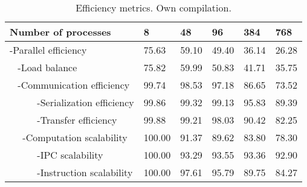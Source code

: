 \begin{table}[htbp]
\centering
\setlength{\extrarowheight}{0pt}
\addtolength{\extrarowheight}{\aboverulesep}
\addtolength{\extrarowheight}{\belowrulesep}
\setlength{\aboverulesep}{0pt}
\setlength{\belowrulesep}{0pt}
\begin{tabular}{|l|l|l|l|l|l|} 
\toprule
\textbf{Number of processes}    & \textbf{8}                                 & \textbf{48}                               & \textbf{96}                               & \textbf{384}                              & \textbf{768}                               \\ 
\hline
-Parallel efficiency            & {\cellcolor[rgb]{0.859,0.341,0.341}}75.63  & {\cellcolor[rgb]{0.859,0.341,0.341}}59.10 & {\cellcolor[rgb]{0.859,0.341,0.341}}49.40 & {\cellcolor[rgb]{0.859,0.341,0.341}}36.14 & {\cellcolor[rgb]{0.859,0.341,0.341}}26.28  \\ 
\hline
~ -Load balance                 & {\cellcolor[rgb]{0.859,0.341,0.341}}75.82  & {\cellcolor[rgb]{0.859,0.341,0.341}}59.99 & {\cellcolor[rgb]{0.859,0.341,0.341}}50.83 & {\cellcolor[rgb]{0.859,0.341,0.341}}41.71 & {\cellcolor[rgb]{0.859,0.341,0.341}}35.75  \\ 
\hline
~ -Communication efficiency     & {\cellcolor[rgb]{0.408,0.753,0.486}}99.74  & {\cellcolor[rgb]{0.478,0.773,0.49}}98.53  & {\cellcolor[rgb]{0.565,0.796,0.494}}97.18 & {\cellcolor[rgb]{0.988,0.749,0.482}}86.65 & {\cellcolor[rgb]{0.859,0.341,0.341}}73.52  \\ 
\hline
~~~~~ -Serialization efficiency & {\cellcolor[rgb]{0.4,0.749,0.486}}99.86    & {\cellcolor[rgb]{0.431,0.761,0.486}}99.32 & {\cellcolor[rgb]{0.443,0.761,0.486}}99.13 & {\cellcolor[rgb]{0.643,0.82,0.498}}95.83  & {\cellcolor[rgb]{0.996,0.89,0.51}}89.39    \\ 
\hline
~~~~~ -Transfer efficiency      & {\cellcolor[rgb]{0.396,0.749,0.486}}99.88  & {\cellcolor[rgb]{0.439,0.761,0.486}}99.21 & {\cellcolor[rgb]{0.51,0.78,0.49}}98.03    & {\cellcolor[rgb]{0.976,0.918,0.518}}90.42 & {\cellcolor[rgb]{0.976,0.525,0.439}}82.25  \\ 
\hline
~~ -Computation scalability     & {\cellcolor[rgb]{0.388,0.745,0.482}}100.00 & {\cellcolor[rgb]{0.918,0.898,0.514}}91.37 & {\cellcolor[rgb]{0.996,0.902,0.514}}89.62 & {\cellcolor[rgb]{0.976,0.525,0.439}}83.80 & {\cellcolor[rgb]{0.859,0.341,0.341}}78.30  \\ 
\hline
~~~~~ -IPC scalability          & {\cellcolor[rgb]{0.388,0.745,0.482}}100.00 & {\cellcolor[rgb]{0.824,0.871,0.51}}93.29  & {\cellcolor[rgb]{0.824,0.871,0.51}}93.55  & {\cellcolor[rgb]{0.824,0.871,0.51}}93.36  & {\cellcolor[rgb]{0.824,0.871,0.51}}92.90   \\ 
\hline
~~~~~ -Instruction scalability  & {\cellcolor[rgb]{0.388,0.745,0.482}}100.00 & {\cellcolor[rgb]{0.537,0.788,0.494}}97.61 & {\cellcolor[rgb]{0.647,0.82,0.498}}95.79  & {\cellcolor[rgb]{0.996,0.906,0.514}}89.75 & {\cellcolor[rgb]{0.976,0.525,0.439}}84.27  \\
\bottomrule
\end{tabular}
\caption[Efficiency metrics.]{Efficiency metrics. Own compilation.}
\label{modelfactors}
\end{table}


